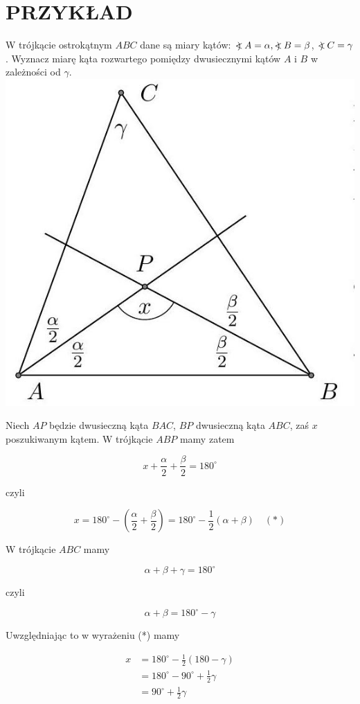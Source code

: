 \documentclass[10pt]{article}
\newcommand\Varangle{\mathop{{<\!\!\!\!\!\text{\small)}}\:}\nolimits}
\begin{document}
\section*{PRZYKŁAD}
W trójkącie ostrokątnym \(A B C\) dane są miary kątów: \(\Varangle A=\alpha, \Varangle B=\beta\), \(\Varangle C=\gamma\). Wyznacz miarę kąta rozwartego pomiędzy dwusiecznymi kątów \(A\) i \(B\) w zależności od \(\gamma\).\\
\includegraphics[max width=\textwidth, center]{2024_11_21_71f62bd117d375398909g-024}

Niech \(A P\) będzie dwusieczną kąta \(B A C\), \(B P\) dwusieczną kąta \(A B C\), zaś \(x\) poszukiwanym kątem. W trójkącie \(A B P\) mamy zatem

\[
x+\frac{\alpha}{2}+\frac{\beta}{2}=180^{\circ}
\]

czyli

\[
x=180^{\circ}-\left(\frac{\alpha}{2}+\frac{\beta}{2}\right)=180^{\circ}-\frac{1}{2}(\alpha+\beta) \quad(*)
\]

W trójkącie \(A B C\) mamy

\[
\alpha+\beta+\gamma=180^{\circ}
\]

czyli

\[
\alpha+\beta=180^{\circ}-\gamma
\]

Uwzględniając to w wyrażeniu (*) mamy

\[
\begin{aligned}
x & =180^{\circ}-\frac{1}{2}(180-\gamma) \\
& =180^{\circ}-90^{\circ}+\frac{1}{2} \gamma \\
& =90^{\circ}+\frac{1}{2} \gamma
\end{aligned}
\]
\end{document}
